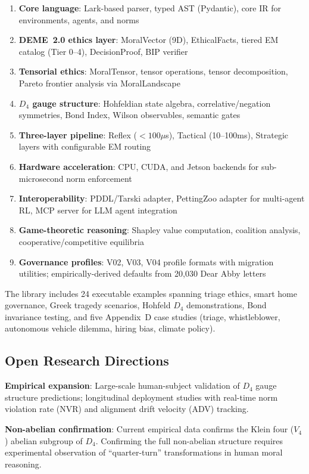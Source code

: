 \documentclass[conference]{IEEEtran}
\begin{document}
\begin{enumerate}
\item \textbf{Core language}: Lark-based parser, typed AST (Pydantic), core IR for environments, agents, and norms
\item \textbf{DEME~2.0 ethics layer}: MoralVector (9D), EthicalFacts, tiered EM catalog (Tier 0--4), DecisionProof, BIP verifier
\item \textbf{Tensorial ethics}: MoralTensor, tensor operations, tensor decomposition, Pareto frontier analysis via MoralLandscape
\item \textbf{$D_4$ gauge structure}: Hohfeldian state algebra, correlative/negation symmetries, Bond Index, Wilson observables, semantic gates
\item \textbf{Three-layer pipeline}: Reflex ($<100\mu$s), Tactical (10--100ms), Strategic layers with configurable EM routing
\item \textbf{Hardware acceleration}: CPU, CUDA, and Jetson backends for sub-microsecond norm enforcement
\item \textbf{Interoperability}: PDDL/Tarski adapter, PettingZoo adapter for multi-agent RL, MCP server for LLM agent integration
\item \textbf{Game-theoretic reasoning}: Shapley value computation, coalition analysis, cooperative/competitive equilibria
\item \textbf{Governance profiles}: V02, V03, V04 profile formats with migration utilities; empirically-derived defaults from 20,030 Dear Abby letters
\end{enumerate}

The library includes 24 executable examples spanning triage ethics, smart home governance, Greek tragedy scenarios, Hohfeld $D_4$ demonstrations, Bond invariance testing, and five Appendix~D case studies (triage, whistleblower, autonomous vehicle dilemma, hiring bias, climate policy).

\subsection{Open Research Directions}

\textbf{Empirical expansion}: Large-scale human-subject validation of $D_4$ gauge structure predictions; longitudinal deployment studies with real-time norm violation rate (NVR) and alignment drift velocity (ADV) tracking.

\textbf{Non-abelian confirmation}: Current empirical data confirms the Klein four ($V_4$) abelian subgroup of $D_4$. Confirming the full non-abelian structure requires experimental observation of ``quarter-turn'' transformations in human moral reasoning.
\end{document}
